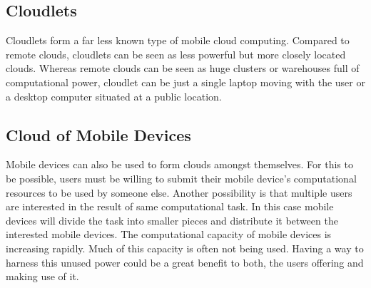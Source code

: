 \documentclass[conference]{IEEEtran}
\begin{document}
\subsection{Cloudlets}
Cloudlets form a far less known type of mobile cloud computing. Compared to remote clouds, cloudlets can be seen as less powerful but more closely located clouds. Whereas remote clouds can be seen as huge clusters or warehouses full of computational power, cloudlet can be just a single laptop moving with the user or a desktop computer situated at a public location.

\subsection{Cloud of Mobile Devices}
Mobile devices can also be used to form clouds amongst themselves. For this to be possible, users must be willing to submit their mobile device's computational resources to be used by someone else. Another possibility is that multiple users are interested in the result of same computational task. In this case mobile devices will divide the task into smaller pieces and distribute it between the interested mobile devices. The computational capacity of mobile devices is increasing rapidly. Much of this capacity is often not being used. Having a way to harness this unused power could be a great benefit to both, the users offering and making use of it.\\
\end{document}
